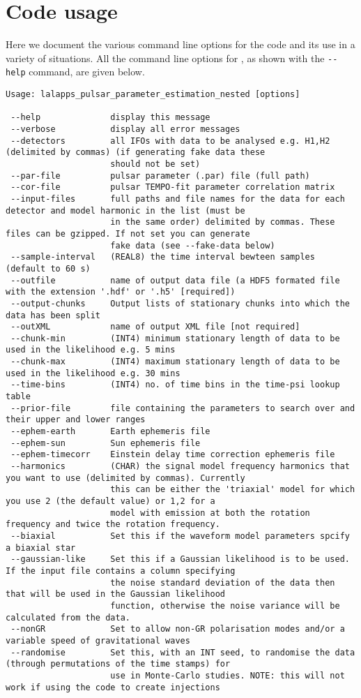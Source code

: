 \section{Code usage}

Here we document the various command line options for the code and its use in a variety of situations. All the command
line options for \lppen, as shown with the \verb|--help| command, are given below.

\begin{footnotesize}
\begin{verbatim}
Usage: lalapps_pulsar_parameter_estimation_nested [options]

 --help              display this message
 --verbose           display all error messages
 --detectors         all IFOs with data to be analysed e.g. H1,H2 (delimited by commas) (if generating fake data these
                     should not be set)
 --par-file          pulsar parameter (.par) file (full path)
 --cor-file          pulsar TEMPO-fit parameter correlation matrix
 --input-files       full paths and file names for the data for each detector and model harmonic in the list (must be
                     in the same order) delimited by commas. These files can be gzipped. If not set you can generate
                     fake data (see --fake-data below)
 --sample-interval   (REAL8) the time interval bewteen samples (default to 60 s)
 --outfile           name of output data file (a HDF5 formated file with the extension '.hdf' or '.h5' [required])
 --output-chunks     Output lists of stationary chunks into which the data has been split
 --outXML            name of output XML file [not required]
 --chunk-min         (INT4) minimum stationary length of data to be used in the likelihood e.g. 5 mins
 --chunk-max         (INT4) maximum stationary length of data to be used in the likelihood e.g. 30 mins
 --time-bins         (INT4) no. of time bins in the time-psi lookup table
 --prior-file        file containing the parameters to search over and their upper and lower ranges
 --ephem-earth       Earth ephemeris file
 --ephem-sun         Sun ephemeris file
 --ephem-timecorr    Einstein delay time correction ephemeris file
 --harmonics         (CHAR) the signal model frequency harmonics that you want to use (delimited by commas). Currently
                     this can be either the 'triaxial' model for which you use 2 (the default value) or 1,2 for a
                     model with emission at both the rotation frequency and twice the rotation frequency.
 --biaxial           Set this if the waveform model parameters spcify a biaxial star
 --gaussian-like     Set this if a Gaussian likelihood is to be used. If the input file contains a column specifying
                     the noise standard deviation of the data then that will be used in the Gaussian likelihood
                     function, otherwise the noise variance will be calculated from the data.
 --nonGR             Set to allow non-GR polarisation modes and/or a variable speed of gravitational waves
 --randomise         Set this, with an INT seed, to randomise the data (through permutations of the time stamps) for
                     use in Monte-Carlo studies. NOTE: this will not work if using the code to create injections


\end{verbatim}
\end{footnotesize}
